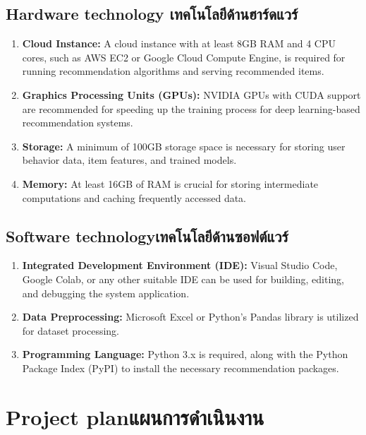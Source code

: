 \subsection{\ifenglish Hardware technology \else เทคโนโลยีด้านฮาร์ดแวร์ \fi}

\begin{enumerate}
    \item \textsf{\textbf{Cloud Instance:} A cloud instance with at least 8GB RAM and 4 CPU cores, such as AWS EC2 
    or Google Cloud Compute Engine, is required for running recommendation algorithms and serving recommended items.}
    \item \textsf{\textbf{Graphics Processing Units (GPUs):} NVIDIA GPUs with CUDA support are recommended for 
    speeding up the training process for deep learning-based recommendation systems.}
    \item \textsf{\textbf{Storage:} A minimum of 100GB storage space is necessary for storing user behavior data, 
    item features, and trained models.}
    \item \textsf{\textbf{Memory:} At least 16GB of RAM is crucial for storing intermediate computations and 
    caching frequently accessed data.}
\end{enumerate}

\subsection{\ifenglish Software technology\else เทคโนโลยีด้านซอฟต์แวร์\fi}

\begin{enumerate}
    \item \textsf{\textbf{Integrated Development Environment (IDE):} Visual Studio Code, Google Colab, or any other suitable 
    IDE can be used for building, editing, and debugging the system application.}
    \item \textsf{\textbf{Data Preprocessing:} Microsoft Excel or Python's Pandas library is utilized for dataset processing.}
    \item \textsf{\textbf{Programming Language:} Python 3.x is required, along with the Python Package Index (PyPI) to install the 
    necessary recommendation packages.}
\end{enumerate}

\section{\ifenglish Project plan\else แผนการดำเนินงาน\fi}

